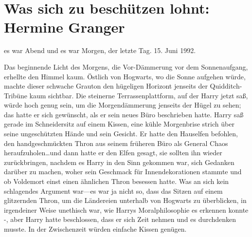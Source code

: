 \chapter{Was sich zu beschützen lohnt: Hermine Granger}

 es war Abend und es war Morgen, der letzte Tag. 15. Juni 1992.

\hplettrineextrapara
Das beginnende Licht des Morgens, die Vor-Dämmerung vor dem Sonnenaufgang, erhellte den Himmel kaum. Östlich von Hogwarts, wo die Sonne aufgehen würde, machte dieser schwache Grauton den hügeligen Horizont jenseits der Quidditch-Tribüne kaum sichtbar.
Die steinerne Terrassenplattform, auf der Harry jetzt saß, würde hoch genug sein, um die Morgendämmerung jenseits der Hügel zu sehen; das hatte er sich gewünscht, als er sein neues Büro beschrieben hatte.
Harry saß gerade im Schneidersitz auf einem Kissen, eine kühle Morgenbrise strich über seine ungeschützten Hände und sein Gesicht. Er hatte den Hauselfen befohlen, den handgeschmückten Thron aus seinem früheren Büro als General Chaos heraufzuholen…und dann hatte er den Elfen gesagt, sie sollten ihn wieder zurückbringen, nachdem es Harry in den Sinn gekommen war, sich Gedanken darüber zu machen, woher sein Geschmack für Innendekorationen stammte und ob Voldemort einst einen ähnlichen Thron besessen hatte. Was an sich kein schlagendes Argument war—es war ja nicht so, dass das Sitzen auf einem glitzernden Thron, um die Ländereien unterhalb von Hogwarts zu überblicken, in irgendeiner Weise unethisch war, wie Harrys Moralphilosophie es erkennen konnte -, aber Harry hatte beschlossen, dass er sich Zeit nehmen und es durchdenken musste. In der Zwischenzeit würden einfache Kissen genügen.


